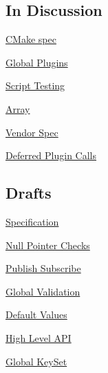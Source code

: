 \subsection*{In Discussion}


\begin{DoxyItemize}
\item \hyperlink{doc_decisions_cmake_spec_md}{C\+Make spec}
\item \hyperlink{doc_decisions_global_plugins_md}{Global Plugins}
\item \hyperlink{doc_decisions_script_testing_md}{Script Testing}
\item \hyperlink{doc_decisions_array_md}{Array}
\item \hyperlink{doc_decisions_vendor_spec_md}{Vendor Spec}
\item \hyperlink{doc_decisions_deferred_plugin_calls_md}{Deferred Plugin Calls}
\end{DoxyItemize}

\subsection*{Drafts}


\begin{DoxyItemize}
\item \hyperlink{doc_decisions_specification_md}{Specification}
\item \hyperlink{doc_decisions_null_pointer_checks_md}{Null Pointer Checks}
\item \hyperlink{doc_decisions_pubsub_md}{Publish Subscribe}
\item \hyperlink{doc_decisions_global_validation_md}{Global Validation}
\item \hyperlink{doc_decisions_default_values_md}{Default Values}
\item \hyperlink{doc_decisions_high_level_api_md}{High Level A\+PI}
\item \hyperlink{doc_decisions_global_keyset_md}{Global Key\+Set} 
\end{DoxyItemize}